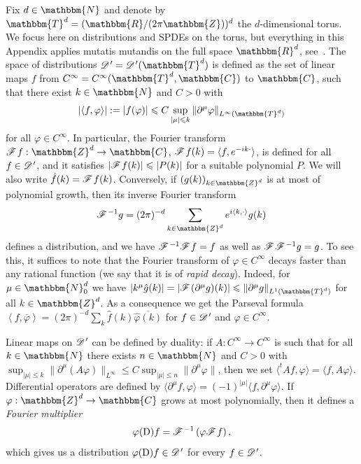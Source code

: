 \documentclass[11pt,reqno]{amsart}
\newcommand{\assign}{:=}
\newcommand{\cdummy}{\cdot}
\newcommand{\mathD}{\mathrm{D}}
\newcommand{\tmtextit}[1]{{\itshape{#1}}}
\newcommand{\CD}{\mathscr{D} \hspace{.1em}}
\newcommand{\CF}{\mathscr{F} \hspace{.1em}}
\begin{document}
Fix $d \in \mathbbm{N}$ and denote by $\mathbbm{T}^d = (\mathbbm{R}/ (2 \pi
\mathbbm{Z}))^d$ the $d$-dimensional torus. We focus here on distributions and
SPDEs on the torus, but everything in this Appendix applies mutatis mutandis
on the full space $\mathbbm{R}^d$, see~{\cite{gubinelli_paracontrolled_2015}}.
The space of distributions $\CD' = \CD' (\mathbbm{T}^d)$ is defined as the set
of linear maps $f$ from $C^{\infty} = C^{\infty} (\mathbbm{T}^d, \mathbbm{C})$
to $\mathbbm{C}$, such that there exist $k \in \mathbbm{N}$ and $C > 0$ with
\[ | \langle f, \varphi \rangle | \assign | f (\varphi) | \leqslant C \sup_{|
   \mu | \leqslant k} \| \partial^{\mu} \varphi \|_{L^{\infty}
   (\mathbbm{T}^d)} \]
for all $\varphi \in C^{\infty}$. In particular, the Fourier transform $\CF f
: \mathbbm{Z}^d \rightarrow \mathbbm{C}$, $\CF f (k) = \langle f, e^{- i k
\cdummy} \rangle$, is defined for all $f \in \CD'$, and it satisfies $\left|
\CF f (k) \right| \leqslant | P (k) |$ for a suitable polynomial $P$. We will
also write $\hat{f} (k) = \CF f (k)$. Conversely, if $(g (k))_{k \in
\mathbbm{Z}^d}$ is at most of polynomial growth, then its inverse Fourier
transform
\[ \CF^{- 1} g = (2 \pi)^{- d} \sum_{k \in \mathbbm{Z}^d} e^{i \langle k,
   \cdummy \rangle} g (k) \]
defines a distribution, and we have $\CF^{- 1} \CF f = f$ as well as $\CF
\CF^{- 1} g = g$. To see this, it suffices to note that the Fourier transform
of $\varphi \in C^{\infty}$ decays faster than any rational function (we say
that it is of \tmtextit{rapid decay}). Indeed, for $\mu \in \mathbbm{N}^d_0$
we have $| k^{\mu} \hat{g} (k) | = \left| \CF (\partial^{\mu} g) (k) \right|
\leqslant \| \partial^{\mu} g \|_{L^1 (\mathbbm{T}^d)}$ for all $k \in
\mathbbm{Z}^d$. As a consequence we get the Parseval formula $\left\langle f,
\overline{\varphi} \right\rangle = (2 \pi)^{- d} \sum_k \hat{f} (k)
\overline{\hat{\varphi} (k)}$ for $f \in \CD'$ and $\varphi \in C^{\infty}$.

Linear maps on $\CD'$ can be defined by duality: if $A : C^{\infty}
\rightarrow C^{\infty}$ is such that for all $k \in \mathbbm{N}$ there exists
$n \in \mathbbm{N}$ and $C > 0$ with $\sup_{| \mu | \leqslant k} \|
\partial^{\mu} (A \varphi) \|_{L^{\infty}} \leqslant C \sup_{| \mu | \leqslant
n} \| \partial^{\mu} \varphi \|$, then we set $\langle^t A f, \varphi \rangle
= \langle f, A \varphi \rangle$. Differential operators are defined by
$\langle \partial^{\mu} f, \varphi \rangle = (- 1)^{| \mu |} \langle f,
\partial^{\mu} \varphi \rangle$. If $\varphi : \mathbbm{Z}^d \rightarrow
\mathbbm{C}$ grows at most polynomially, then it defines a \tmtextit{Fourier
multiplier}
\[ \varphi (\mathD) f = \CF^{- 1} \left( \varphi \CF f \right), \]
which gives us a distribution $\varphi (\mathD) f \in \CD'$ for every $f \in
\CD'$.
\end{document}
